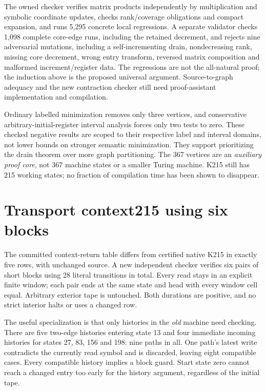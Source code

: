 \documentclass[11pt]{article}
\begin{document}
The owned checker verifies matrix products independently by multiplication and symbolic coordinate updates, checks rank/coverage obligations and compact expansion, and runs 5,295 concrete local regressions. A separate validator checks 1,098 complete core-edge runs, including the retained decrement, and rejects nine adversarial mutations, including a self-incrementing drain, nondecreasing rank, missing core decrement, wrong entry transform, reversed matrix composition and malformed increment/register data. The regressions are not the all-natural proof; the induction above is the proposed universal argument. Source-to-graph adequacy and the new contraction checker still need proof-assistant implementation and compilation.

Ordinary labelled minimization removes only three vertices, and conservative arbitrary-initial-register interval analysis forces only two tests to zero. These checked negative results are scoped to their respective label and interval domains, not lower bounds on stronger semantic minimization. They support prioritizing the drain theorem over more graph partitioning. The 367 vertices are an \emph{auxiliary proof core}, not 367 machine states or a smaller Turing machine. K215 still has 215 working states; no fraction of compilation time has been shown to disappear.

\section{Transport context215 using six blocks}
The committed context-return table differs from certified native K215 in exactly five rows, with unchanged source. A new independent checker verifies six pairs of short blocks using 28 literal transitions in total. Every read stays in an explicit finite window; each pair ends at the same state and head with every window cell equal. Arbitrary exterior tape is untouched. Both durations are positive, and no strict interior halts or uses a changed row.

The useful specialization is that only histories in the \emph{old} machine need checking. There are five two-edge histories entering state 13 and four immediate incoming histories for states 27, 83, 156 and 198: nine paths in all. One path's latest write contradicts the currently read symbol and is discarded, leaving eight compatible cases. Every compatible history implies a block guard. Start state zero cannot reach a changed entry too early for the history argument, regardless of the initial tape.
\end{document}
